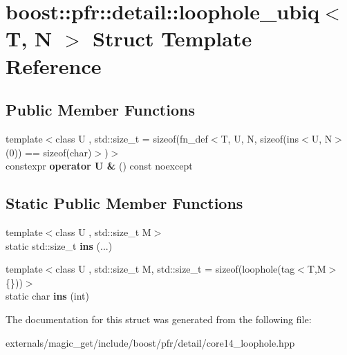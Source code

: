 \hypertarget{structboost_1_1pfr_1_1detail_1_1loophole__ubiq}{}\section{boost\+:\+:pfr\+:\+:detail\+:\+:loophole\+\_\+ubiq$<$ T, N $>$ Struct Template Reference}
\label{structboost_1_1pfr_1_1detail_1_1loophole__ubiq}
\subsection*{Public Member Functions}
\begin{DoxyCompactItemize}
\item 
\mbox{\label{structboost_1_1pfr_1_1detail_1_1loophole__ubiq_adf946ea559e74023a421b7231b58918a}} 
{\footnotesize template$<$class U , std\+::size\+\_\+t  = sizeof(fn\+\_\+def$<$\+T, U, N, sizeof(ins$<$\+U, N$>$(0)) == sizeof(char)$>$)$>$ }\\constexpr {\bfseries operator U \&} () const noexcept
\end{DoxyCompactItemize}
\subsection*{Static Public Member Functions}
\begin{DoxyCompactItemize}
\item 
\mbox{\label{structboost_1_1pfr_1_1detail_1_1loophole__ubiq_ac60be1d13c47a476da2791c776f25945}} 
{\footnotesize template$<$class U , std\+::size\+\_\+t M$>$ }\\static std\+::size\+\_\+t {\bfseries ins} (...)
\item 
\mbox{\label{structboost_1_1pfr_1_1detail_1_1loophole__ubiq_a346d7c9774d19aac9748e136edc026ce}} 
{\footnotesize template$<$class U , std\+::size\+\_\+t M, std\+::size\+\_\+t  = sizeof(loophole(tag$<$\+T,\+M$>$\{\}))$>$ }\\static char {\bfseries ins} (int)
\end{DoxyCompactItemize}


The documentation for this struct was generated from the following file\+:\begin{DoxyCompactItemize}
\item 
externals/magic\+\_\+get/include/boost/pfr/detail/core14\+\_\+loophole.\+hpp\end{DoxyCompactItemize}
